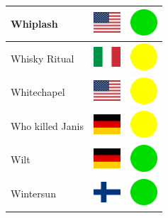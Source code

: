 \documentclass[12pt, a4paper, twoside]{report}
\begin{document}
\begin{center}
\begin{longtable}{|p{5cm}|p{2cm}|p{2cm}|}
 Whiplash                                                   & \includegraphics[width=1cm]{../img/flags/us} &   \includegraphics[width=1cm]{../likes/y} \\ \hline
 Whisky Ritual                                              & \includegraphics[width=1cm]{../img/flags/it} &   \includegraphics[width=1cm]{../likes/m} \\ \hline
 Whitechapel                                                & \includegraphics[width=1cm]{../img/flags/us} &   \includegraphics[width=1cm]{../likes/m} \\ \hline
 Who killed Janis                                           & \includegraphics[width=1cm]{../img/flags/de} &   \includegraphics[width=1cm]{../likes/m} \\ \hline
 Wilt                                                       & \includegraphics[width=1cm]{../img/flags/de} &   \includegraphics[width=1cm]{../likes/y} \\ \hline
 Wintersun                                                  & \includegraphics[width=1cm]{../img/flags/fi} &   \includegraphics[width=1cm]{../likes/y} \\ \hline

\end{longtable}
\end{center}
\end{document}
